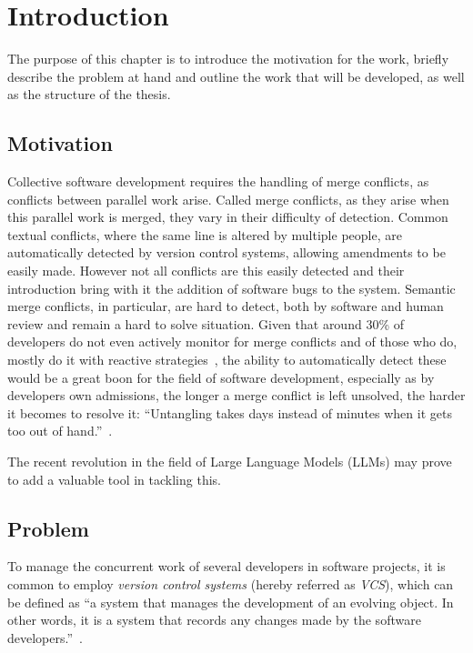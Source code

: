 \chapter{Introduction} \label{chap:intro}

The purpose of this chapter is to introduce the motivation for the work, briefly describe the problem at hand and outline the work that will be developed, as well as the structure of the thesis.

\section{Motivation} \label{sec:motivation}

Collective software development requires the handling of merge conflicts, as conflicts between parallel work arise. Called merge conflicts, as they arise when this parallel work is merged, they vary in their difficulty of detection.
Common textual conflicts, where the same line is altered by multiple people, are automatically detected by version control systems, allowing amendments to be easily made. However not all conflicts are this easily detected and their introduction bring with it the addition of software bugs to the system. Semantic merge conflicts, in particular, are hard to detect, both by software and human review and remain a hard to solve situation. Given that around 30\% of developers do not even actively monitor for merge conflicts and of those who do, mostly do it with reactive strategies~\cite{kn:lifecycle}, the ability to automatically detect these would be a great boon for the field of software development, especially as by developers own admissions, the longer a merge conflict is left unsolved, the harder it becomes to resolve it: ``Untangling takes days instead of minutes when it gets too out of hand.''~\cite{kn:lifecycle}.

The recent revolution in the field of Large Language Models (LLMs) may prove to add a valuable tool in tackling this.


\section{Problem} \label{sec:problem}

To manage the concurrent work of several developers in software projects, it is common to employ \emph{version control systems} (hereby referred as \emph{VCS}), which can be defined as ``a system that manages the development of an evolving object. In other words, it is a system that records any changes made by the software developers.''~\cite{kn:vers_review}.

